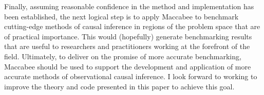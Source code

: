\documentclass[../main.tex]{subfiles}
\begin{document}
\vspace{\baselineskip}

Finally, assuming reasonable confidence in the method and implementation has been established, the next logical step is to apply Maccabee to benchmark cutting-edge methods of causal inference in regions of the problem space that are of practical importance. This would (hopefully) generate benchmarking results that are useful to researchers and practitioners working at the forefront of the field. Ultimately, to deliver on the promise of more accurate benchmarking, Maccabee should be used to support the development and application of more accurate methods of observational causal inference. I look forward to working to improve the theory and code presented in this paper to achieve this goal.
\end{document}

